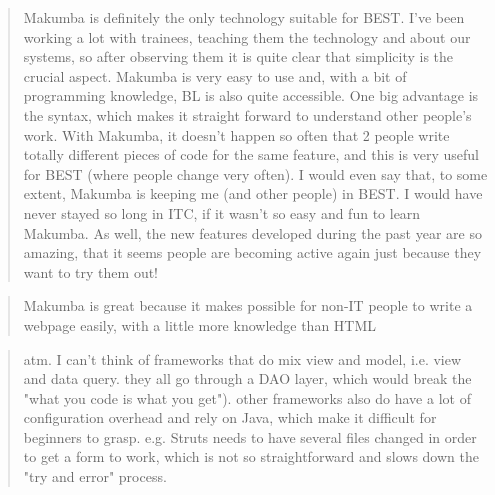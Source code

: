 \documentclass{acm_proc_article-sp}
\begin{document}
\begin{quotation}
	Makumba is definitely the only technology suitable for BEST. I've been working a lot with trainees, teaching them the technology and about our systems, so after observing them it is quite clear that simplicity is the crucial aspect. Makumba is very easy to use and, with a bit of programming knowledge, BL is also quite accessible. One big advantage is the syntax, which makes it straight forward to understand other people's work. With Makumba, it doesn't happen so often that 2 people write totally different pieces of code for the same feature, and this is very useful for BEST (where people change very often). I would even say that, to some extent, Makumba is keeping me (and other people) in BEST. I would have never stayed so long in ITC, if it wasn't so easy and fun to learn Makumba. As well, the new features developed during the past year are so amazing, that it seems people are becoming active again just because they want to try them out! 
\end{quotation}


\begin{quotation}
	Makumba is great because it makes possible for non-IT people to write a webpage easily, with a little more knowledge than HTML
\end{quotation}

\begin{quotation}
	atm. I can't think of frameworks that do mix view and model, i.e. view and data query. they all go through a DAO layer, which would break the "what you code is what you get"). other frameworks also do have a lot of configuration overhead and rely on Java, which make it difficult for beginners to grasp. e.g. Struts needs to have several files changed in order to get a form to work, which is not so straightforward and slows down the "try and error" process. 
\end{quotation}
\end{document}

